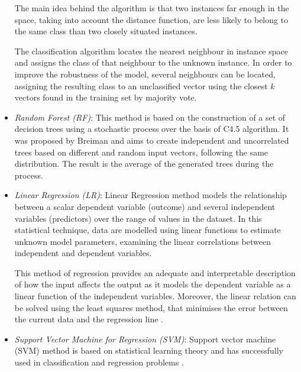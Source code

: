 \documentclass[a4paper,10pt,twocolumn,preprint,3p]{elsarticle}
\begin{document}
\begin{itemize}
The main idea behind the algorithm is that two instances far enough in the space, 
taking into account the distance function, are less likely to belong to the 
same class than two closely situated instances.

The classification algorithm locates the nearest neighbour in instance space and 
assigns the class of that neighbour to the unknown instance.
In order to improve the robustness of the model, several neighbours can be 
located, assigning the resulting class to an unclassified vector using the 
closest $k$ vectors found in the training set by majority vote.


 \item \emph{Random Forest (RF)}: This method is based on the
   construction of a set of decision trees using a stochastic process
   over the basis of C4.5 algorithm. It was proposed by Breiman
   \cite{Breiman2001} and aims to create independent and uncorrelated
   trees based on different and random input vectors, following the
   same distribution. 
The result is the average of the generated trees during the process.


 \item \emph{Linear Regression (LR)}:
 Linear Regression \cite{Cohen2003,Yan2009,Rencher2102,EnkeT05} method models the 
relationship between a scalar dependent variable (outcome) and several independent 
variables (predictors) over the range of values in the dataset. 
In this statistical technique, data are modelled using linear functions to estimate unknown model parameters, examining the linear correlations between independent and dependent variables.

This method of regression provides an adequate and interpretable description of 
how the input affects the output as it models the dependent variable as a linear 
function of the independent variables. Moreover, the linear relation can be 
solved using the least squares method, that minimises the error between the 
current data and the regression line \cite{McClendon2015}.


 \item \emph{Support Vector Machine for Regression (SVM)}:
Support vector machine (SVM) \cite{Cortes1995,Shevade1999,MinSVM05} method is based on  
statistical learning theory and has successfully used in classification and  
regression problems \cite{Cao2003,Jari2008}.


\end{itemize}
\end{document}
